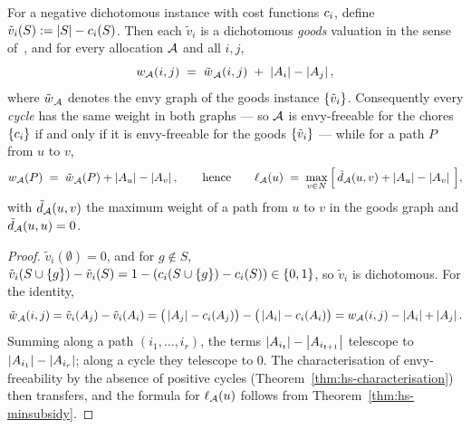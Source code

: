 \begin{theorem}
\label{thm:sizeshift}
For a negative dichotomous instance with cost functions $c_i$, define
$\tilde{v}_i(S) := \left\lvert S\right\rvert - c_i(S)$. Then each $\tilde{v}_i$ is a
dichotomous \emph{goods} valuation in the sense of~\cite{BKNS22}, and for every
allocation $\mathcal{A}$ and all $i,j$,
\[
  w_{\mathcal{A}}(i,j) \;=\; \tilde{w_{}}_{\mathcal{A}}(i,j) \;+\;
  \left\lvert A_{i}\right\rvert - \left\lvert A_{j}\right\rvert,
\]
where $\tilde{w_{}}_{\mathcal{A}}$ denotes the envy graph of the goods instance
$\left\{\tilde{v}_i\right\}$. Consequently every \emph{cycle} has the same weight in both
graphs --- so $\mathcal{A}$ is envy-freeable for the chores $\left\{c_i\right\}$ if and
only if it is envy-freeable for the goods $\left\{\tilde{v}_i\right\}$ --- while for a
path $P$ from $u$ to $v$,
\[
  w_{\mathcal{A}}(P) \;=\; \tilde{w_{}}_{\mathcal{A}}(P) + \left\lvert A_{u}\right\rvert -
  \left\lvert A_{v}\right\rvert,
  \qquad\text{hence}\qquad
  \ell_{\mathcal{A}}(u) \;=\; \max_{v \in N}\Big[\,\tilde{d}_{\mathcal{A}}(u,v) +
  \left\lvert A_{u}\right\rvert - \left\lvert A_{v}\right\rvert\,\Big],
\]
with $\tilde{d}_{\mathcal{A}}(u,v)$ the maximum weight of a path from $u$ to $v$ in
the goods graph and $\tilde{d}_{\mathcal{A}}(u,u) = 0$.
\end{theorem}

\begin{proof}
$\tilde{v}_i(\emptyset) = 0$, and for $g \notin S$,
$\tilde{v}_i(S \cup \left\{g\right\}) - \tilde{v}_i(S) = 1 - (c_i(S \cup \left\{g\right\}) -
c_i(S)) \in \left\{0,1\right\}$, so $\tilde{v}_i$ is dichotomous. For the identity,
\[
  \tilde{w_{}}_{\mathcal{A}}(i,j) = \tilde{v}_i(A_{j}) - \tilde{v}_i(A_{i})
  = \big(\left\lvert A_{j}\right\rvert - c_i(A_{j})\big) -
    \big(\left\lvert A_{i}\right\rvert - c_i(A_{i})\big)
  = w_{\mathcal{A}}(i,j) - \left\lvert A_{i}\right\rvert + \left\lvert A_{j}\right\rvert .
\]
Summing along a path $(i_1,\dots,i_r)$, the terms
$\left\lvert A_{i_t}\right\rvert - \left\lvert A_{i_{t+1}}\right\rvert$ telescope to
$\left\lvert A_{i_1}\right\rvert - \left\lvert A_{i_r}\right\rvert$; along a cycle they telescope to $0$. The
characterisation of envy-freeability by the absence of positive cycles
(Theorem~\ref{thm:hs-characterisation}) then transfers, and the formula for
$\ell_{\mathcal{A}}(u)$ follows from Theorem~\ref{thm:hs-minsubsidy}.
\end{proof}


